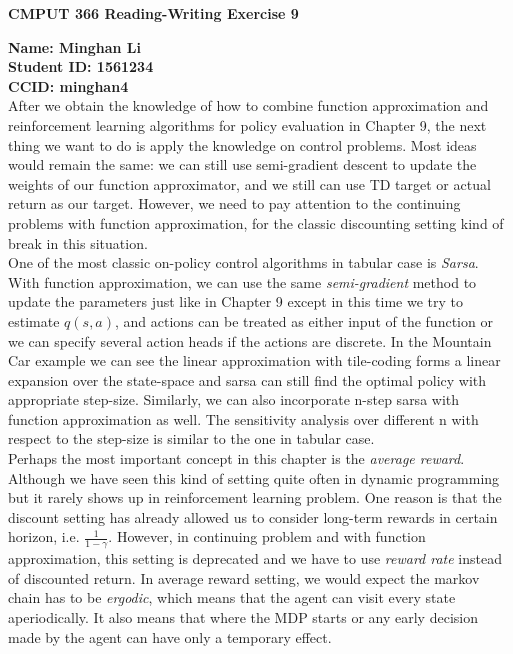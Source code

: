 \documentclass[12pt,a4paper]{article}
\begin{document}
\centerline{\large{\textbf{CMPUT 366 Reading-Writing Exercise 9}}}
\noindent \textbf{Name: Minghan Li}\\
\textbf{Student ID: 1561234}\\
\textbf{CCID: minghan4}\\

After we obtain the knowledge of how to combine function approximation and reinforcement learning algorithms for policy evaluation in Chapter 9, the next thing we want to do is apply the knowledge on control problems. Most ideas would remain the same: we can still use semi-gradient descent to update the weights of our function approximator, and we still can use TD target or actual return as our target. However, we need to pay attention to the continuing problems with function approximation, for the classic discounting setting kind of break in this situation.\\

One of the most classic on-policy control algorithms in tabular case is \textit{Sarsa}. With function approximation, we can use the same \textit{semi-gradient} method to update the parameters just like in Chapter 9 except in this time we try to estimate $q(s,a)$, and actions can be treated as either input of the function or we can specify several action heads if the actions are discrete. In the Mountain Car example we can see the linear approximation with tile-coding forms a linear expansion over the state-space and sarsa can still find the optimal policy with appropriate step-size. Similarly, we can also incorporate n-step sarsa with function approximation as well. The sensitivity analysis over different n with respect to the step-size is similar to the one in tabular case.\\

Perhaps the most important concept in this chapter is the \textit{average reward}. Although we have seen this kind of setting quite often in dynamic programming but it rarely shows up in reinforcement learning problem. One reason is that the discount setting has already allowed us to consider long-term rewards in certain horizon, i.e. $\frac{1}{1-\gamma}$. However, in continuing problem and with function approximation, this setting is deprecated and we have to use \textit{reward rate} instead of discounted return. In average reward setting, we would expect the markov chain has to be \textit{ergodic}, which means that the agent can visit every state aperiodically. It also means that where the MDP starts or any early decision made by the agent can have only a temporary effect.\\
\end{document}
